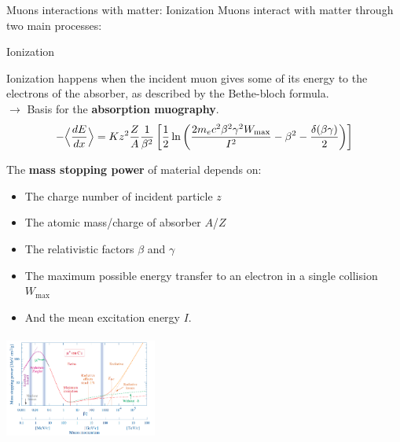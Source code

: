 \documentclass[8 pt]{beamer}
\begin{document}
\begin{frame}{Muons interactions with matter: Ionization}
\justifying
Muons interact with matter through two main processes:
\begin{exampleblock}{} Ionization \end{exampleblock}
\justifying
Ionization happens when the  incident muon gives some of its energy to the electrons of the absorber, as described by the Bethe-bloch formula.
\\
\hspace{10pt} $\rightarrow$ Basis for the \textbf{\alert{absorption muography}}.\vfill
\begin{equation*}
\label{eq:BB}
- \Bigl \langle \frac{dE}{dx} \Bigr \rangle = K z^2 \frac{Z}{A} \frac{1}{\beta^2} \left [\frac{1}{2} \ln \left (\frac{2 m_e c^2 \beta^2 \gamma^2 W_{\text{max}}}{I^2} - \beta^2 - \frac{\delta(\beta \gamma)}{2} \right ) \right ]
\end{equation*} \vfill

\begin{minipage}[c]{.58\textwidth}
The \textbf{mass stopping power} of material depends on:
\begin{itemize}
	\item The charge number of incident particle $z$
	\item The atomic mass/charge of absorber $A$/$Z$
	\item The relativistic factors $\beta$ and $\gamma$
	\item The maximum possible energy transfer to an electron in a single collision $W_{\text{max}}$
	\item And the mean excitation energy $I$.
\end{itemize} \vfill
\end{minipage}
\begin{minipage}[c]{.38\textwidth}
	\includegraphics[width=5cm, height=3.5cm]{figs/BB.png}
\end{minipage}
\end{frame}
\end{document}
